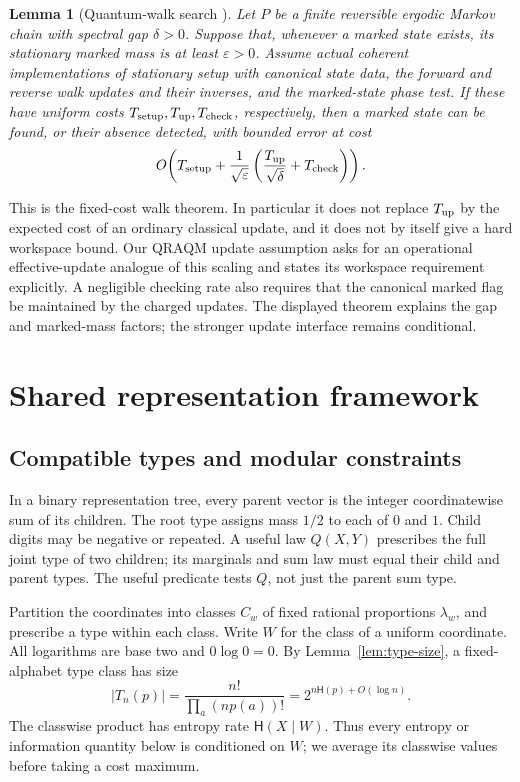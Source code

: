\documentclass[10pt,a4paper]{article}
\newtheorem{lemma}[theorem]{Lemma}
\theoremstyle{definition}
\newcommand{\HH}{\mathsf H}
\begin{document}
\begin{lemma}[Quantum-walk search
  {\cite[Theorem~3]{MNRS}}]
\label{lem:mnrs}
Let $P$ be a finite reversible ergodic Markov chain with spectral gap
$\delta>0$. Suppose that, whenever a marked state exists, its stationary
marked mass is at least $\varepsilon>0$.
Assume actual coherent implementations of stationary setup with canonical
state data, the forward and reverse walk updates and their inverses, and
the marked-state phase test. If these have uniform costs
$T_{\rm setup},T_{\rm up},T_{\rm check}$, respectively, then a marked
state can be found, or their absence detected, with bounded error at cost
\[
 O\!\left(T_{\rm setup}+
 \frac{1}{\sqrt\varepsilon}
 \left(\frac{T_{\rm up}}{\sqrt\delta}+T_{\rm check}\right)\right).
\]
\end{lemma}
This is the fixed-cost walk theorem. In particular it does not replace
$T_{\rm up}$ by the expected cost of an ordinary classical update, and it
does not by itself give a hard workspace bound. Our QRAQM update assumption
asks for an operational effective-update analogue of this scaling and
states its workspace requirement explicitly. A negligible checking rate
also requires that the canonical marked flag be maintained by the charged
updates. The displayed theorem explains the gap and marked-mass factors;
the stronger update interface remains conditional.



\section{Shared representation framework}\label{sec:framework}
\subsection{Compatible types and modular constraints}
In a binary representation tree, every parent vector is the integer
coordinatewise sum of its children. The root type assigns mass $1/2$
to each of $0$ and $1$. Child digits may be negative or repeated.
A useful law $Q(X,Y)$ prescribes the full joint type of two children;
its marginals and sum law must equal their child and parent types.
The useful predicate tests $Q$, not just the parent sum type.

Partition the coordinates into classes $C_w$ of fixed rational proportions
$\lambda_w$, and prescribe a type within each class. Write $W$ for the
class of a uniform coordinate. All logarithms are base two and
$0\log0=0$. By Lemma~\ref{lem:type-size}, a fixed-alphabet type class has size
\[
 |T_n(p)|=\frac{n!}{\prod_a(np(a))!}
       =2^{n\HH(p)+O(\log n)}.
\]
The classwise product has entropy rate $\HH(X\mid W)$.
Thus every entropy or information quantity below is conditioned on $W$;
we average its classwise values before taking a cost maximum.
\end{document}
